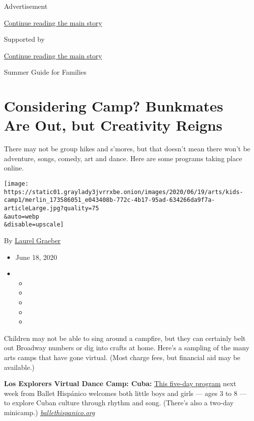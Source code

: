 Advertisement

\protect\hyperlink{after-top}{Continue reading the main story}

Supported by

\protect\hyperlink{after-sponsor}{Continue reading the main story}

Summer Guide for Families

\hypertarget{considering-camp-bunkmates-are-out-but-creativity-reigns}{%
\section{Considering Camp? Bunkmates Are Out, but Creativity
Reigns}\label{considering-camp-bunkmates-are-out-but-creativity-reigns}}

There may not be group hikes and s'mores, but that doesn't mean there
won't be adventure, songs, comedy, art and dance. Here are some programs
taking place online.

\texttt{[image: https://static01.graylady3jvrrxbe.onion/images/2020/06/19/arts/kids-camp1/merlin\_173586051\_e043408b-772c-4b17-95ad-634266da9f7a-articleLarge.jpg?quality=75\\\&auto=webp\\\&disable=upscale]}

By \href{https://www.nytimes3xbfgragh.onion/by/laurel-graeber}{Laurel
Graeber}

\begin{itemize}
\item
  June 18, 2020
\item
  \begin{itemize}
  \item
  \item
  \item
  \item
  \item
  \end{itemize}
\end{itemize}

Children may not be able to sing around a campfire, but they can
certainly belt out Broadway numbers or dig into crafts at home. Here's a
sampling of the many arts camps that have gone virtual. (Most charge
fees, but financial aid may be available.)

\textbf{Los Explorers Virtual Dance Camp: Cuba:}
\href{https://www.ballethispanico.org/school/b-learning-online/virtual-los-explorers}{This
five-day program} next week from Ballet Hispánico welcomes both little
boys and girls --- ages 3 to 8 --- to explore Cuban culture through
rhythm and song. (There's also a two-day minicamp.)
\href{https://www.ballethispanico.org/}{\emph{ballethispanico.org}}

